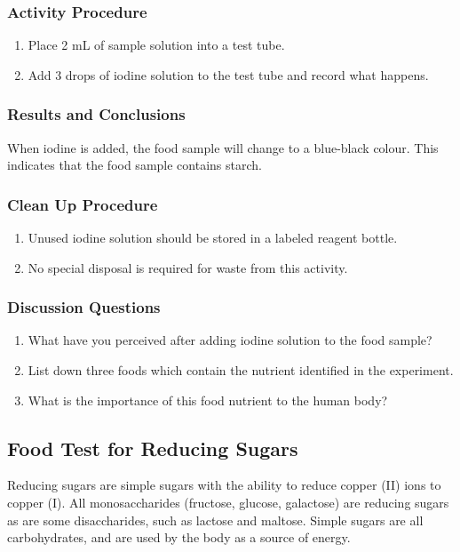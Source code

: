 \subsubsection*{Activity Procedure}
\begin{enumerate}
\item{Place 2 mL of sample solution into a test tube.}
\item{Add 3 drops of iodine solution to the test tube and record what happens.}
\end{enumerate}

\subsubsection*{Results and Conclusions}
When iodine is added, the food sample will change to a blue-black colour. This indicates that the food sample contains starch.

\subsubsection*{Clean Up Procedure}
\begin{enumerate}
\item{Unused iodine solution should be stored in a labeled reagent bottle.}
\item{No special disposal is required for waste from this activity.}
\end{enumerate}

\subsubsection*{Discussion Questions}
\begin{enumerate}
\item{What have you perceived after adding iodine solution to the food sample?}
\item{List down three foods which contain the nutrient identified in the experiment.}
\item{What is the importance of this food nutrient to the human body?}
\end{enumerate}

\subsection{Food Test for Reducing Sugars}
Reducing sugars are simple sugars with the ability to reduce copper (II) ions to copper (I). All monosaccharides (fructose, glucose, galactose) are reducing sugars as are some disaccharides, such as lactose and maltose. Simple sugars are all carbohydrates, and are used by the body as a source of energy.

